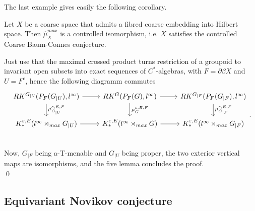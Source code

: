 The last example gives easily the following corollary.

\begin{cor}
Let $X$ be a coarse space that admits a fibred coarse embedding into Hilbert space. Then $\hat \mu_{X}^{max}$ is a controlled isomorphism, i.e. $X$ satisfies the controlled Coarse Baum-Connes conjecture.
\end{cor}

\begin{dem}
Just use that the maximal crossed product turns restriction of a groupoid to invariant open subsets into exact sequences of $C^*$-algebras, with $F=\partial\beta X$ and $U= F^c$, hence the following diagramm commutes
\[\begin{tikzcd}
RK^{G_{|U}}(P_F(G_{|U}),l^\infty)\arrow{r}\arrow{d}{\mu_{G_{|U}}^{\varepsilon,E,F}} & RK^G(P_F(G),l^\infty)\arrow{r}\arrow{d}{\mu_{G}^{\varepsilon,E,F}}  & RK^{G_{|F}}(P_F(G_{|F}),l^\infty)\arrow{d}{\mu_{G_{|F}}^{\varepsilon,E,F}}  \\
K_*^{\varepsilon,E}(l^\infty \rtimes_{max} G_{|U}) \arrow{r} & K_*^{\varepsilon,E}(l^\infty \rtimes_{max} G) \arrow{r} & K_*^{\varepsilon,E}(l^\infty \rtimes_{max} G_{|F}) \\
\end{tikzcd}.\]
Now, $G_{|F}$ being a-T-menable and $G_{|U}$ being proper, the two exterior vertical maps are isomorphisms, and the five lemma concludes the proof.\\
\qed
\end{dem}

\subsection{Equivariant Novikov conjecture}
